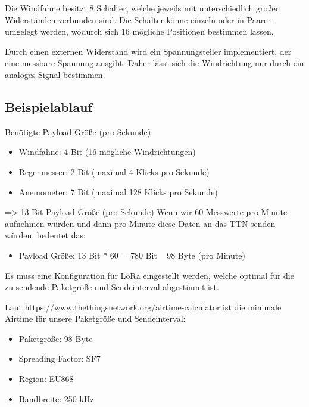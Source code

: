 \documentclass[12pt]{article}
\begin{document}
        Die Windfahne besitzt 8 Schalter, welche jeweils mit unterschiedlich großen Widerständen verbunden sind.
        Die Schalter könne einzeln oder in Paaren umgelegt werden, wodurch sich 16 mögliche Positionen bestimmen lassen.

        Durch einen externen Widerstand wird ein Spannungsteiler implementiert, der eine messbare Spannung ausgibt.
        Daher lässt sich die Windrichtung nur durch ein analoges Signal bestimmen.

    \subsection{Beispielablauf}

      Benötigte Payload Größe (pro Sekunde):

      \begin{itemize}
        \item Windfahne: 4 Bit (16 mögliche Windrichtungen)
        \item Regenmesser: 2 Bit (maximal 4 Klicks pro Sekunde)
        \item Anemometer: 7 Bit (maximal 128 Klicks pro Sekunde)
      \end{itemize}

      => 13 Bit Payload Größe (pro Sekunde)
      Wenn wir 60 Messwerte pro Minute aufnehmen würden und dann pro Minute diese Daten an das TTN senden würden, bedeutet das:

      \begin{itemize}
        \item Payload Größe: 13 Bit * 60 = 780 Bit ~ 98 Byte (pro Minute)
      \end{itemize}

      Es muss eine Konfiguration für LoRa eingestellt werden, welche optimal für die zu sendende Paketgröße und Sendeinterval abgestimmt ist.

      Laut https://www.thethingsnetwork.org/airtime-calculator ist die minimale Airtime für unsere Paketgröße und Sendeinterval:

      \begin{itemize}
        \item Paketgröße: 98 Byte
        \item Spreading Factor: SF7
        \item Region: EU868
        \item Bandbreite: 250 kHz
      \end{itemize}
\end{document}
